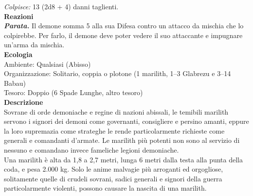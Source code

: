 \begin{multicols}{2}
\emph{Colpisce:} 13 (2d8 + 4) danni taglienti.\\
\textbf{Reazioni}\\
\emph{\textbf{Parata.}} Il demone somma 5 alla sua Difesa contro un attacco da mischia che lo colpirebbe. Per farlo, il demone deve poter vedere il suo attaccante e impugnare un'arma da mischia.\\
\textbf{Ecologia}\\
Ambiente: Qualsiasi (Abisso)\\
Organizzazione: Solitario, coppia o plotone (1 marilith, 1–3 Glabrezu e 3–14 Babau)\\
Tesoro: Doppio (6 Spade Lunghe, altro tesoro)\\
\textbf{Descrizione}\\
Sovrane di orde demoniache e regine di nazioni abissali, le temibili marilith servono i signori dei demoni come governanti, consigliere e persino amanti, eppure la loro supremazia come strateghe le rende particolarmente richieste come generali e comandanti d’armate. Le marilith più potenti non sono al servizio di nessuno e comandano invece fameliche legioni demoniache.\\
Una marilith è alta da 1,8 a 2,7 metri, lunga 6 metri dalla testa alla punta della coda, e pesa 2.000 kg. Solo le anime malvagie più arroganti ed orgogliose, solitamente quelle di crudeli sovrani, sadici generali e signori della guerra particolarmente violenti, possono causare la nascita di una marilith.\\


\end{multicols}

